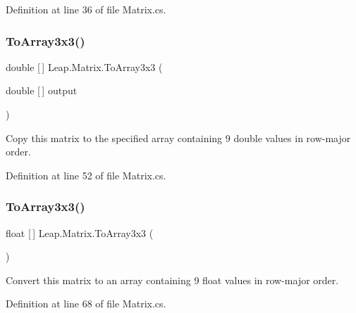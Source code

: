 Definition at line 36 of file Matrix.\+cs.

\mbox{\label{struct_leap_1_1_matrix_a5d9c2654aaaf9db5a9a2d7a89835d0c8}} 
\subsubsection{\texorpdfstring{ToArray3x3()}{ToArray3x3()}\hspace{0.1cm}{\footnotesize\ttfamily [2/3]}}
{\footnotesize\ttfamily double \mbox{[}$\,$\mbox{]} Leap.\+Matrix.\+To\+Array3x3 (\begin{DoxyParamCaption}\item[{double \mbox{[}$\,$\mbox{]}}]{output }\end{DoxyParamCaption})}



Copy this matrix to the specified array containing 9 double values in row-\/major order. 



Definition at line 52 of file Matrix.\+cs.

\mbox{\label{struct_leap_1_1_matrix_a8eb2abbd6d9fe31e37b62db08271b004}} 
\subsubsection{\texorpdfstring{ToArray3x3()}{ToArray3x3()}\hspace{0.1cm}{\footnotesize\ttfamily [3/3]}}
{\footnotesize\ttfamily float \mbox{[}$\,$\mbox{]} Leap.\+Matrix.\+To\+Array3x3 (\begin{DoxyParamCaption}{ }\end{DoxyParamCaption})}



Convert this matrix to an array containing 9 float values in row-\/major order. 



Definition at line 68 of file Matrix.\+cs.

\mbox{\label{struct_leap_1_1_matrix_a6b6f2d1f0762dcde621566f9d189dd59}} 
